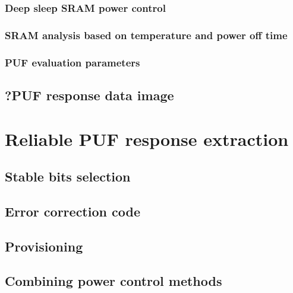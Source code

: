 \subsection{Deep sleep SRAM power control}
\subsection{SRAM analysis based on temperature and power off time}
\subsection{PUF evaluation parameters}\label{sec:deepsleep_evaluation}

\section{?PUF response data image} %

\chapter{Reliable PUF response extraction} %

\section{Stable bits selection}

\section{Error correction code}

\section{Provisioning}

\section{Combining power control methods}

